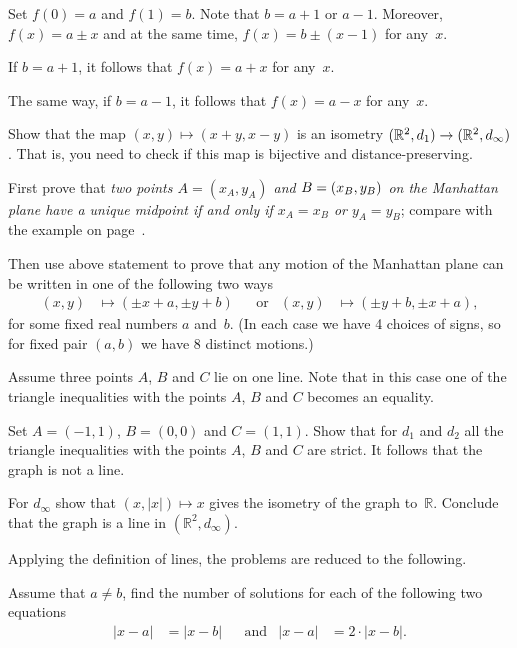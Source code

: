 Set $f(0)=a$ and $f(1)=b$.
Note that $b=a+1$ or $a-1$.
Moreover, $f(x)=a\pm x$ and at the same time, $f(x)=b\pm(x-1)$ for any~$x$.

If $b=a+1$, 
it follows that 
$f(x)=a+x$ for any~$x$.

The same way, if $b=a-1$, 
it follows that 
$f(x)=a-x$ for any~$x$.

Show that the map $(x,y)\mapsto (x+y,x-y)$ is an isometry  $(\mathbb{R}^2,d_1)\z\to (\mathbb{R}^2,d_\infty)$.
That is, you need to check if this map is bijective and distance-preserving.

First prove that \textit{two points $A=(x_A,y_A)$ and $B\z=(x_B,y_B)$ on the Manhattan plane have a unique midpoint if and only if $x_A=x_B$ or $y_A=y_B$}; compare with the example on page~\pageref{example:isometric but not congruent}. 

Then use above statement to prove that
any motion of the Manhattan plane 
can be written in one of the following two ways
\begin{align*}
(x,y)&\mapsto (\pm x+a,\pm y+b)
&&\text{or} 
&(x,y)&\mapsto (\pm y+b,\pm x+a),
\end{align*}
for some fixed real numbers $a$ and~$b$.
(In each case we have 4 choices of signs, so for fixed pair $(a,b)$ we have 8 distinct motions.)

Assume three points $A$, $B$ and $C$ lie on one line.
Note that in this case one of the triangle inequalities with the points $A$, $B$ and $C$ becomes an equality.

Set $A=(-1,1)$, $B=(0,0)$ and $C=(1,1)$.
Show that for $d_1$ and $d_2$
all the triangle inequalities with the points $A$, $B$ and $C$ are strict.
It follows that the graph is not a line.

For $d_\infty$ show that $(x,|x|)\mapsto x$ gives the isometry of the graph to~$\mathbb{R}$.
Conclude that the graph is a line in $(\mathbb{R}^2,d_\infty)$.

Applying the definition of lines,
the problems are reduced to the following.

Assume that $a\ne b$,
find the number of solutions for each of the following two equations
\begin{align*}
|x-a|&=|x-b|
&&\text{and}
&|x-a|&=2\cdot |x-b|.
\end{align*}

